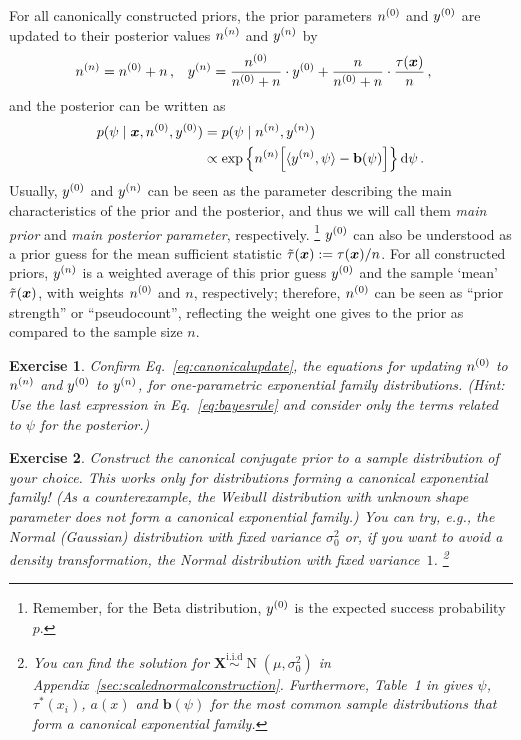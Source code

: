 \documentclass[12pt,a4paper	,twoside]{article}
\newcommand{\dd}{\,\mathrm{d}}
\newcommand{\mbf}[1]{\mathbf{#1}}
\newcommand{\bs}[1]{\boldsymbol{#1}}
\renewcommand{\vec}[1]{{\bs#1}}
\newcommand{\E}{\operatorname{E}}
\newcommand{\norm}{\operatorname{N}}
\newtheorem{myex}{Exercise}
\begin{document}
For all canonically constructed priors,
the prior parameters $n^{(0)}$ and $y^{(0)}$ are updated to their posterior values $n^{(n)}$ and $y^{(n)}$ by
\begin{align}\label{eq:canonicalupdate}
\nn &= \nz + n\,, &
\yn &= \frac{\nz}{\nz + n} \cdot \yz + \frac{n}{\nz + n} \cdot \frac{\tau(\vec{x})}{n}\,,
\end{align}
and the posterior can be written as
\begin{align}\label{eq:canonicalposterior}
p(\psi \mid \vec{x}, \nz, \yz)
 &= p(\psi \mid \nn, \yn) \nonumber\\
 &\propto \exp\Big\{ \nn \Big[ \langle \yn, \psi \rangle - \mbf{b}(\psi) \Big] \Big\} \dd\psi\,.
\end{align}
Usually, $y^{(0)}$ and $y^{(n)}$ can be seen as the parameter describing the main characteristics of the prior and the posterior,
and thus we will call them \emph{main prior} and \emph{main posterior parameter}, respectively.%
\footnote{Remember, for the Beta distribution, $y^{(0)}$ is the expected success probability $p$.}
$y^{(0)}$ can also be understood as a prior guess for the mean sufficient statistic $\ttau(\vec{x}) := \tau(\vec{x})/n$. %
For all constructed priors, $y^{(n)}$ is a weighted average of this prior guess $y^{(0)}$ and the sample `mean' $\ttau(\vec{x})$,
with weights $n^{(0)}$ and $n$, respectively;
therefore, $n^{(0)}$ can be seen as ``prior strength'' or ``pseudocount'',
reflecting the weight one gives to the prior as compared to the sample size $n$.
\begin{myex}
Confirm Eq.~\eqref{eq:canonicalupdate},
the equations for updating $n^{(0)}$ to $n^{(n)}$ and $y^{(0)}$ to $y^{(n)}$,
for one-parametric exponential family distributions.
(Hint: Use the last expression in Eq.~\eqref{eq:bayesrule}
and consider only the terms related to $\psi$ for the posterior.)
\end{myex}

\begin{myex}
\label{ex:constructconjugate}
Construct the canonical conjugate prior to a sample distribution of your choice.
This works only for distributions forming a canonical exponential family!
(As a counterexample, the Weibull distribution with unknown shape parameter does not form a canonical exponential family.)
You can try, e.g., the Normal (Gaussian) distribution with fixed variance $\sigma^2_0$
or, if you want to avoid a density transformation, the Normal distribution with fixed variance~$1$.%
\footnote{You can find the solution for $\vec{X} \stackrel{\text{i.i.d}}{\sim} \norm(\mu, \sigma^2_0)$
in Appendix~\ref{sec:scalednormalconstruction}.
Furthermore, Table~1 in \textcite{2005:quaeghebeurcooman} gives $\psi$, $\tau^*(x_i)$, $a(x)$ and $\mbf{b}(\psi)$
for the most common sample distributions that form a canonical exponential family.}
\end{myex}
\end{document}
